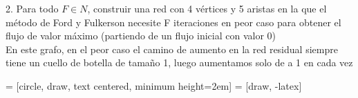 \documentclass{article}
\begin{document}
2. Para todo $F \in N$, construir una red con 4 vértices y 5 aristas en la que el método de Ford y Fulkerson necesite F iteraciones en peor caso para obtener el flujo de valor máximo (partiendo de un flujo inicial con valor 0) \\ 

En este grafo, en el peor caso el camino de aumento en la red residual siempre tiene un cuello de botella de tamaño 1, luego aumentamos solo de a 1 en cada vez

 = [circle, draw, text centered, minimum height=2em]
 = [draw, -latex]

\end{document}
